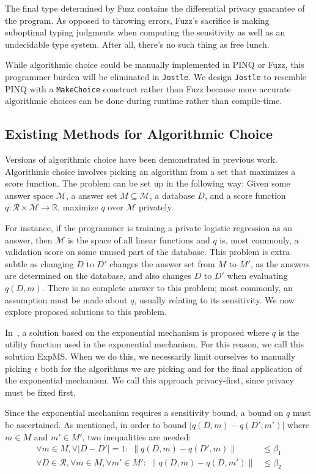 \documentclass[11pt]{report}
\newcommand{\Jostle}{\texttt{Jostle}}
\renewcommand{\t}[1]{\texttt{#1}}
\begin{document}
The final type determined by Fuzz contains the differential privacy guarantee of the program. As opposed to throwing errors, Fuzz's sacrifice is making suboptimal typing judgments when computing the sensitivity as well as an undecidable type system. After all, there's no such thing as free lunch.

While algorithmic choice could be manually implemented in PINQ or Fuzz, this programmer burden will be eliminated in \Jostle{}. We design \Jostle{} to resemble PINQ with a \t{MakeChoice} construct rather than Fuzz because more accurate algorithmic choices can be done during runtime rather than compile-time.

\subsection{Existing Methods for Algorithmic Choice}\label{sec:algchoice}

Versions of algorithmic choice have been demonstrated in previous work. Algorithmic choice involves picking an algorithm from a set that maximizes a score function. The problem can be set up in the following way: Given some answer space $\mathcal{M}$, a answer set $M \subseteq \mathcal{M}$, a database $D$, and a score function $q: \mathcal{R} \times \mathcal{M} \rightarrow \mathbb{R}$, maximize $q$ over $\mathcal{M}$ privately.

For instance, if the programmer is training a private logistic regression as an answer, then $\mathcal{M}$ is the space of all linear functions and $q$ is, most commonly, a validation score on some unused part of the database. This problem is extra subtle as changing $D$ to $D'$ changes the answer set from $M$ to $M'$, as the answers are determined on the database, and also changes $D$ to $D'$ when evaluating $q(D, m)$. There is no complete answer to this problem; most commonly, an assumption must be made about $q$, usually relating to its sensitivity. We now explore proposed solutions to this problem.

In~\cite{Chaudhuri:2013}, a solution based on the exponential mechanism is proposed where $q$ is the utility function used in the exponential mechanism. For this reason, we call this solution ExpMS. When we do this, we necessarily limit ourselves to manually picking $\epsilon$ both for the algorithms we are picking and for the final application of the exponential mechanism. We call this approach privacy-first, since privacy must be fixed first.

Since the exponential mechanism requires a sensitivity bound, a bound on $q$ must be ascertained. As mentioned, in order to bound $|q(D, m) - q(D', m')|$ where $m \in M$ and $m' \in M'$, two inequalities are needed:
\begin{align*}
\forall m\in M,\forall |D-D'|=1:\;\|q(D, m) - q(D', m)\| &\leq \beta_1 \\
\forall D\in \mathcal{R},\forall m \in M,\forall m'\in M':\;\|q(D, m) -  q(D, m')\| &\leq \beta_2
\end{align*}
\end{document}
